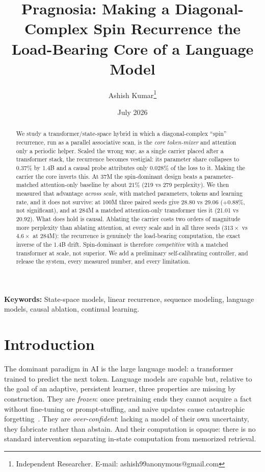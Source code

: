 \documentclass[10pt,twocolumn]{article}
\title{Pragnosia: Making a Diagonal-Complex Spin Recurrence the Load-Bearing Core of a Language Model}
\author{Ashish Kumar\thanks{Independent Researcher. E-mail: ashish99anonymous@gmail.com}}
\date{July 2026}
\begin{document}
\maketitle


\begin{abstract}
We study a transformer/state-space hybrid in which a diagonal-complex ``spin'' recurrence, run as a parallel associative scan, is the \emph{core token-mixer} and attention only a periodic helper. Scaled the wrong way, as a single carrier placed after a transformer stack, the recurrence becomes vestigial: its parameter share collapses to $0.37\%$ by 1.4B and a causal probe attributes only $0.028\%$ of the loss to it. Making the carrier the core inverts this. At 37M the spin-dominant design beats a parameter-matched attention-only baseline by about $21\%$ (219 vs 279 perplexity). We then measured that advantage \emph{across scale}, with matched parameters, tokens and learning rate, and it does not survive: at 100M three paired seeds give 28.80 vs 29.06 ($+0.88\%$, not significant), and at 284M a matched attention-only transformer ties it (21.01 vs 20.92). What does hold is causal. Ablating the carrier costs two orders of magnitude more perplexity than ablating attention, at every scale and in all three seeds ($313\times$ vs $4.6\times$ at 284M): the recurrence is genuinely the load-bearing computation, the exact inverse of the 1.4B drift. Spin-dominant is therefore \emph{competitive} with a matched transformer at scale, not superior. We add a preliminary self-calibrating controller, and release the system, every measured number, and every limitation.
\end{abstract}

\noindent\textbf{Keywords:} State-space models, linear recurrence, sequence modeling, language models, causal ablation, continual learning.

\section{Introduction}
The dominant paradigm in AI is the large language model: a transformer~\cite{vaswani2017} trained to predict the next token. Language models are capable but, relative to the goal of an adaptive, persistent learner, three properties are missing by construction. They are \emph{frozen}: once pretraining ends they cannot acquire a fact without fine-tuning or prompt-stuffing, and naive updates cause catastrophic forgetting~\cite{mccloskey1989}. They are \emph{over-confident}: lacking a model of their own uncertainty, they fabricate rather than abstain. And their computation is opaque: there is no standard intervention separating in-state computation from memorized retrieval.
\end{document}
